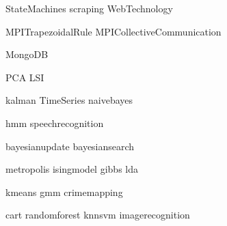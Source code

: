 \documentclass[nociteref]{SIAM-GH-book}
\begin{document}
{StateMachines}
{scraping}
{WebTechnology}

{MPITrapezoidalRule}
{MPICollectiveCommunication}

{MongoDB}

{PCA}
{LSI}

{kalman}
{TimeSeries}
{naivebayes}

{hmm}
{speechrecognition}

{bayesianupdate}
{bayesiansearch}

{metropolis}
{isingmodel}
{gibbs}
{lda}

{kmeans}
{gmm}
{crimemapping}

{cart}
{randomforest}
{knnsvm}
{imagerecognition}
\end{document}
